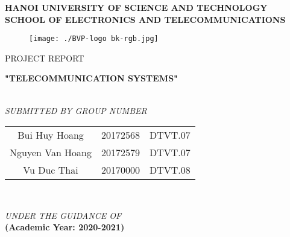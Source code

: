\documentclass[a4paper, 13pt]{report}
\begin{document}
\begin{titlepage}
\begin{center}
    \textup{\large \textbf{HANOI UNIVERSITY OF SCIENCE AND TECHNOLOGY}\\[0.5cm]\textbf{SCHOOL OF ELECTRONICS AND TELECOMMUNICATIONS}}\\[1cm]
\end{center}
\begin{center}
\begin{figure}[h]  %
\centering
\texttt{[image: ./BVP-logo bk-rgb.jpg]}\\[1cm]
\end{figure}
\textup{\large  PROJECT REPORT\\[1cm]}
\begin{LARGE}
{\textbf {"TELECOMMUNICATION SYSTEMS" }}\end{LARGE}\\[3cm]
\textit{SUBMITTED BY GROUP NUMBER}\\[0.5cm]
\begin{large}
\begin{tabular}{ c c c }
 Bui Huy Hoang & 20172568 & DTVT.07 \\[0.4cm] 
 Nguyen Van Hoang & 20172579 & DTVT.07 \\ [0.4cm] 
 Vu Duc Thai & 20170000 & DTVT.08 \\ [0.4cm]  
\end{tabular}\\[1cm]
\end{large}
\textit{UNDER THE GUIDANCE OF}\\[0.7cm]
\textbf{(Academic Year: 2020-2021)}
\vfill
\end{center}
\end{titlepage}

\setcounter{page}{1}
\newpage
\tableofcontents
\listoffigures
\listoftables



\newpage
{}
\end{document}
